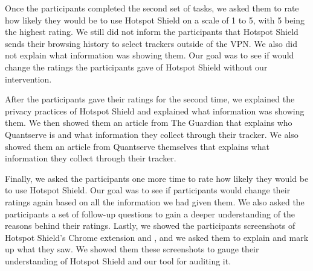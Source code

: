 Once the participants completed the second set of tasks, we asked them to rate how likely they would be to use Hotspot Shield on a scale of 1 to 5, with 5 being the highest rating.
We still did not inform the participants that Hotspot Shield sends their browsing history to select trackers outside of the VPN.
We also did not explain what information \tool was showing them.
Our goal was to see if \tool would change the ratings the participants gave of Hotspot Shield without our intervention.

After the participants gave their ratings for the second time, we explained the privacy practices of Hotspot Shield and explained what information \tool was showing them.
We then showed them an article from The Guardian that explains who Quantserve is and what information they collect through their tracker.
We also showed them an article from Quantserve themselves that explains what information they collect through their tracker.

Finally, we asked the participants one more time to rate how likely they would
be to use Hotspot Shield.  Our goal was to see if participants would change
their ratings again based on all the information we had given them.  We also
asked the participants a set of follow-up questions to gain a deeper
understanding of the reasons behind their ratings.  Lastly, we showed the
participants screenshots of Hotspot Shield's Chrome extension and \tool,
and we asked them to explain and mark up what they saw.  We showed them these
screenshots to gauge their understanding of Hotspot Shield and our tool for
auditing it.



